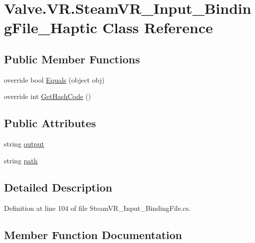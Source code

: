 \hypertarget{class_valve_1_1_v_r_1_1_steam_v_r___input___binding_file___haptic}{}\section{Valve.\+V\+R.\+Steam\+V\+R\+\_\+\+Input\+\_\+\+Binding\+File\+\_\+\+Haptic Class Reference}
\label{class_valve_1_1_v_r_1_1_steam_v_r___input___binding_file___haptic}
\subsection*{Public Member Functions}
\begin{DoxyCompactItemize}
\item 
override bool \mbox{\hyperlink{class_valve_1_1_v_r_1_1_steam_v_r___input___binding_file___haptic_acf2e83dd42b7cb9c3bd2db604587c803}{Equals}} (object obj)
\item 
override int \mbox{\hyperlink{class_valve_1_1_v_r_1_1_steam_v_r___input___binding_file___haptic_a29728fc20ed44e25ed238a628eb81b19}{Get\+Hash\+Code}} ()
\end{DoxyCompactItemize}
\subsection*{Public Attributes}
\begin{DoxyCompactItemize}
\item 
string \mbox{\hyperlink{class_valve_1_1_v_r_1_1_steam_v_r___input___binding_file___haptic_aec40b6c3008974b8238ea1136e893784}{output}}
\item 
string \mbox{\hyperlink{class_valve_1_1_v_r_1_1_steam_v_r___input___binding_file___haptic_ac4fbdb79f8b72bfe206bf8ef337b7b6d}{path}}
\end{DoxyCompactItemize}


\subsection{Detailed Description}


Definition at line 104 of file Steam\+V\+R\+\_\+\+Input\+\_\+\+Binding\+File.\+cs.



\subsection{Member Function Documentation}
\mbox{\label{class_valve_1_1_v_r_1_1_steam_v_r___input___binding_file___haptic_acf2e83dd42b7cb9c3bd2db604587c803}} 
